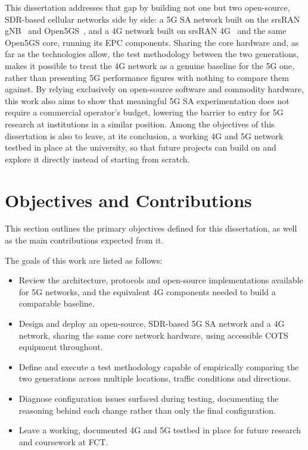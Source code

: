 This dissertation addresses that gap by building not one but two open-source, \gls{SDR}-based cellular networks side by side: a 5G \gls{SA} network built on the srsRAN \gls{gNB}~\cite{ocudu_project} and Open5GS~\cite{open5gs_repo}, and a 4G network built on srsRAN 4G~\cite{srsran_4g_repo} and the same Open5GS core, running its \gls{EPC} components. Sharing the core hardware and, as far as the technologies allow, the test methodology between the two generations, makes it possible to treat the 4G network as a genuine baseline for the 5G one, rather than presenting 5G performance figures with nothing to compare them against. By relying exclusively on open-source software and commodity hardware, this work also aims to show that meaningful 5G \gls{SA} experimentation does not require a commercial operator's budget, lowering the barrier to entry for 5G research at institutions in a similar position. Among the objectives of this dissertation is also to leave, at its conclusion, a working 4G and 5G network testbed in place at the university, so that future projects can build on and explore it directly instead of starting from scratch.

\section{Objectives and Contributions}
\label{sec:objectives-contributions}

This section outlines the primary objectives defined for this dissertation, as well as the main contributions expected from it.

The goals of this work are listed as follows:
\begin{itemize}
    \item Review the architecture, protocols and open-source implementations available for 5G networks, and the equivalent 4G components needed to build a comparable baseline.
    \item Design and deploy an open-source, \gls{SDR}-based 5G \gls{SA} network and a 4G network, sharing the same core network hardware, using accessible \gls{COTS} equipment throughout.
    \item Define and execute a test methodology capable of empirically comparing the two generations across multiple locations, traffic conditions and directions.
    \item Diagnose configuration issues surfaced during testing, documenting the reasoning behind each change rather than only the final configuration.
    \item Leave a working, documented 4G and 5G testbed in place for future research and coursework at \gls{FCT}.
\end{itemize}

